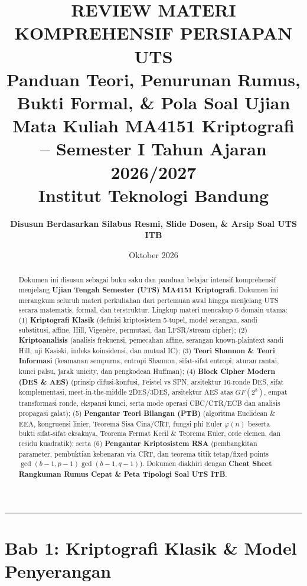 \documentclass[11pt,a4paper]{article}
\title{
    \vspace{-1.5cm}
    \textbf{\huge REVIEW MATERI KOMPREHENSIF PERSIAPAN UTS}\\[0.4cm]
    \textbf{\Large Panduan Teori, Penurunan Rumus, Bukti Formal, \& Pola Soal Ujian}\\[0.2cm]
    \large Mata Kuliah MA4151 Kriptografi -- Semester I Tahun Ajaran 2026/2027\\[0.1cm]
    \large Institut Teknologi Bandung
}
\author{\textbf{Disusun Berdasarkan Silabus Resmi, Slide Dosen, \& Arsip Soal UTS ITB}}
\date{Oktober 2026}
\begin{document}
\maketitle
\vspace{-0.5cm}

\begin{abstract}
Dokumen ini disusun sebagai buku saku dan panduan belajar intensif komprehensif menjelang \textbf{Ujian Tengah Semester (UTS) MA4151 Kriptografi}. Dokumen ini merangkum seluruh materi perkuliahan dari pertemuan awal hingga menjelang UTS secara matematis, formal, dan terstruktur. Lingkup materi mencakup 6 domain utama: (1) \textbf{Kriptografi Klasik} (definisi kriptosistem 5-tupel, model serangan, sandi substitusi, affine, Hill, Vigen\`ere, permutasi, dan LFSR/stream cipher); (2) \textbf{Kriptoanalisis} (analisis frekuensi, pemecahan affine, serangan known-plaintext sandi Hill, uji Kasiski, indeks koinsidensi, dan mutual IC); (3) \textbf{Teori Shannon \& Teori Informasi} (keamanan sempurna, entropi Shannon, sifat-sifat entropi, aturan rantai, kunci palsu, jarak unicity, dan pengkodean Huffman); (4) \textbf{Block Cipher Modern (DES \& AES)} (prinsip difusi-konfusi, Feistel vs SPN, arsitektur 16-ronde DES, sifat komplementasi, meet-in-the-middle 2DES/3DES, arsitektur AES atas $GF(2^8)$, empat transformasi ronde, ekspansi kunci, serta mode operasi CBC/CTR/ECB dan analisis propagasi galat); (5) \textbf{Pengantar Teori Bilangan (PTB)} (algoritma Euclidean \& EEA, kongruensi linier, Teorema Sisa Cina/CRT, fungsi phi Euler $\varphi(n)$ beserta bukti sifat-sifat eksaknya, Teorema Fermat Kecil \& Teorema Euler, orde elemen, dan residu kuadratik); serta (6) \textbf{Pengantar Kriptosistem RSA} (pembangkitan parameter, pembuktian kebenaran via CRT, dan teorema titik tetap/fixed points $\gcd(b-1, p-1)\gcd(b-1, q-1)$). Dokumen diakhiri dengan \textbf{Cheat Sheet Rangkuman Rumus Cepat \& Peta Tipologi Soal UTS ITB}.
\end{abstract}

\vspace{0.2cm}
\hrule
\vspace{0.3cm}

\tableofcontents
\newpage

\section{Bab 1: Kriptografi Klasik \& Model Penyerangan}
\end{document}

